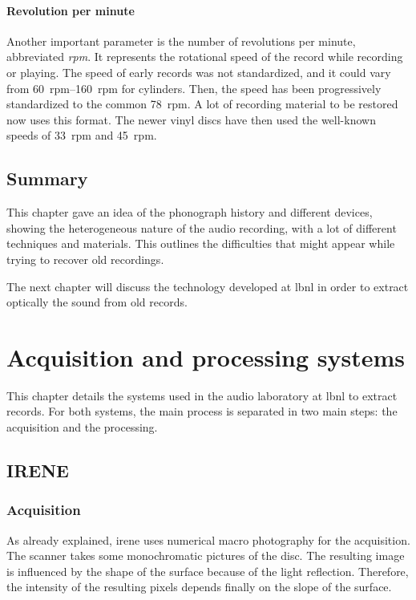 \subsubsection{Revolution per minute}

Another important parameter is the number of revolutions per minute, abbreviated \emph{rpm}. It represents the rotational speed of the record while recording or playing. The speed of early records was not standardized, and it could vary from \SIrange[range-units=single]{60}{160}{rpm} for cylinders. Then, the speed has been progressively standardized to the common \SI{78}{rpm}. A lot of recording material to be restored now uses this format. The newer vinyl discs have then used the well-known speeds of \SI{33}{rpm} and \SI{45}{rpm}.

\section{Summary}

This chapter gave an idea of the phonograph history and different devices, showing the heterogeneous nature of the audio recording, with a lot of different techniques and materials. This outlines the difficulties that might appear while trying to recover old recordings.

The next chapter will discuss the technology developed at \gls{lbnl} in order to extract optically the sound from old records.

\chapter{Acquisition and processing systems}
\label{chap:acqprocsys}

This chapter details the systems used in the audio laboratory at \gls{lbnl} to extract records. For both systems, the main process is separated in two main steps: the acquisition and the processing.

\section{IRENE}

\subsection{Acquisition}

As already explained, \gls{irene} uses numerical macro photography for the acquisition. The scanner takes some monochromatic pictures of the disc. The resulting image is influenced by the shape of the surface because of the light reflection. Therefore, the intensity of the resulting pixels depends finally on the slope of the surface.

